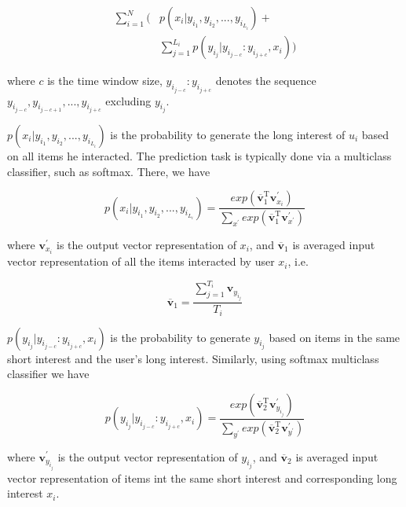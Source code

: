 \documentclass{sig-alternate-05-2015}
\begin{document}
\begin{equation}
\begin{aligned}
	\sum_{i=1}^{N} \bigg( &p(x_i | y_{i_1}, y_{i_2}, ..., y_{i_{L_i}}) + \\
	                      &\sum_{j=1}^{L_i} p(y_{i_j} | y_{i_{j-c}} : y_{i_{j+c}}, x_i) \bigg)
\end{aligned}
\end{equation}

where $c$ is the time window size, $y_{i_{j-c}} : y_{i_{j+c}}$ denotes the sequence
$y_{i_{j-c}}, y_{i_{j-c+1}}, ..., y_{i_{j+c}}$ excluding $y_{i_j}$.

$p(x_i | y_{i_1}, y_{i_2}, ..., y_{i_{L_i}})$ is the probability to generate
the long interest of $u_i$ based on all items he interacted.
The prediction task is typically done via a multiclass classifier,
such as softmax. There, we have

\begin{equation}
	p(x_i | y_{i_1}, y_{i_2}, ..., y_{i_{L_i}}) =
	\frac
	{
		exp ( \overline{\mathbf{v}}_{1}^{\mathrm{T}} \mathbf{v}_{x_i}^{'} )
	}
	{
		\sum_{x^{'}} exp ( \overline{\mathbf{v}}_{1}^{\mathrm{T}} \mathbf{v}_{x^{'}}^{'} )
	}
\end{equation}

where $\mathbf{v}_{x_i}^{'}$ is the output vector representation of $x_i$,
and $\overline{\mathbf{v}}_{1}$ is averaged input vector representation of all the items
interacted by user $x_i$, i.e.

\begin{equation}
	\overline{\mathbf{v}}_{1} = \frac{\sum_{j=1}^{T_i} \mathbf{v}_{y_{i_j}}}{T_i}
\end{equation}

$p(y_{i_j} | y_{i_{j-c}} : y_{i_{j+c}}, x_i)$
is the probability to generate $y_{i_j}$ based on items in the same short interest
and the user's long interest. Similarly, using softmax multiclass classifier we have

\begin{equation}
	p(y_{i_j} | y_{i_{j-c}} : y_{i_{j+c}}, x_i) =
	\frac
	{
		exp( \overline{\mathbf{v}}_{2}^{\mathrm{T}} \mathbf{v}_{y_{i_j}}^{'} )
	}
	{
		\sum_{y^{'}} exp( \overline{\mathbf{v}}_{2}^{\mathrm{T}} \mathbf{v}_{y^{'}}^{'} )
	}
\end{equation}

where $\mathbf{v}_{y_{i_j}}^{'}$ is the output vector representation of $y_{i_j}$,
and $\overline{\mathbf{v}}_{2}$ is averaged input vector representation of items
int the same short interest and corresponding long interest $x_i$.
\end{document}
